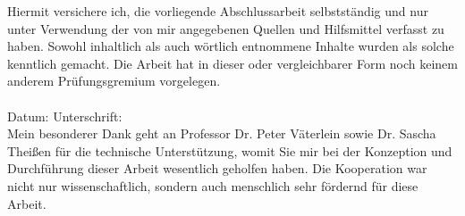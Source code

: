 \label{erklaerung}

Hiermit versichere ich, die vorliegende Abschlussarbeit selbstständig und nur unter Verwendung der von mir angegebenen Quellen und Hilfsmittel verfasst zu haben. Sowohl inhaltlich als auch wörtlich entnommene Inhalte wurden als solche kenntlich gemacht. Die Arbeit hat in dieser oder vergleichbarer Form noch keinem anderem Prüfungsgremium vorgelegen. \\
\\[1.5cm]
Datum:	\hrulefill\enspace Unterschrift: \hrulefill
\\[3.5cm]

\newpage
{}
\label{danksagungen}
Mein besonderer Dank geht an Professor Dr. Peter Väterlein sowie Dr. Sascha Theißen für die technische Unterstützung, womit Sie mir bei der Konzeption und Durchführung dieser Arbeit wesentlich geholfen haben. Die Kooperation war nicht nur wissenschaftlich, sondern auch menschlich sehr fördernd für diese Arbeit. 

